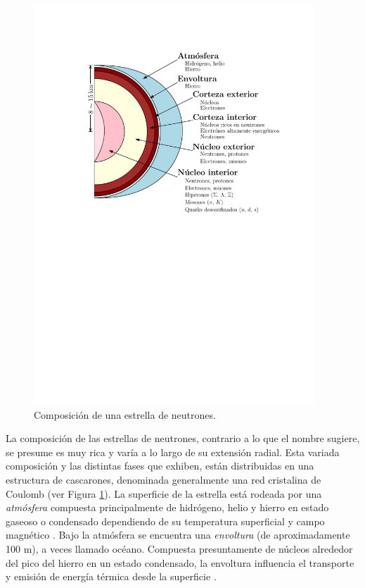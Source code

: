 \begin{figure}%
    \centering
    \includegraphics[width=300pt]{figures/neutronstar.pdf}
    \caption[Composición de una estrella de neutrones]{Composición de una estrella de neutrones.\protect\footnotemark}
    \label{NSC}
\end{figure}



\noindent La composición de las estrellas de neutrones, contrario a lo que el nombre sugiere, se presume es muy rica y varía a lo largo de su extensión radial. Esta variada composición y las distintas fases que exhiben, están distribuidas en una estructura de cascarones, denominada generalmente una red cristalina de Coulomb (ver Figura \ref{NSC}).
La superficie de la estrella está rodeada por una \emph{atmósfera} compuesta principalmente de hidrógeno, helio y hierro en estado gaseoso o condensado dependiendo de su temperatura superficial y campo magnético \cite{Zavlin2002}. %
Bajo la atmósfera se encuentra una \emph{envoltura} (de aproximadamente 100 \si{\metre}), a veces llamado océano. Compuesta presuntamente de núcleos alrededor del pico del hierro en un estado condensado, la envoltura influencia el transporte y emisión de energía térmica desde la superficie \cite{Piekarewicz2013,Potekhin2010,Lattimer2004}.

